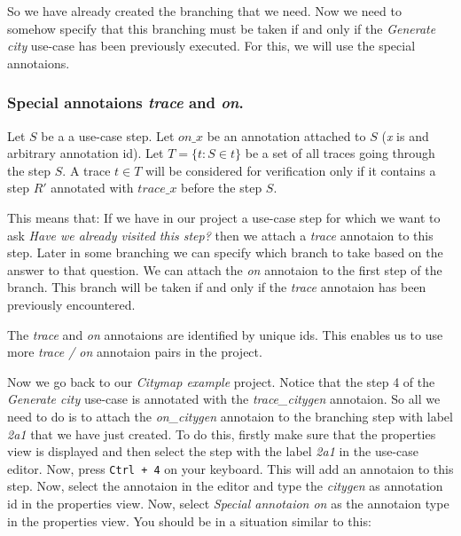 So we have already created the branching that we need. Now we need to somehow specify that this branching must be taken if and
only if the \emph{Generate city} use-case has been previously executed. For this, we will use the special annotaions.

\subsubsection{Special annotaions \emph{trace} and \emph{on}.}
\begin{definition}
	Let $S$ be a a use-case step.
	Let $on\_x$ be an annotation attached to $S$ (\emph{x} is and arbitrary annotation id).
	Let $T=\{t: S \in t\}$ be a set of all traces going through the step $S$.
	A trace $t \in T$ will be considered for verification only if it contains a step $R'$ annotated with $trace\_x$ before the step $S$.
\end{definition}

This means that: If we have in our project a use-case step for which we want to ask \emph{Have we already visited this step?} then
we attach a \emph{trace} annotaion to this step. Later in some branching we can specify which branch to take based on the answer
to that question. We can attach the \emph{on} annotaion to the first step of the branch. This branch will be taken if and only if
the \emph{trace} annotaion has been previously encountered.

The \emph{trace} and \emph{on} annotaions are identified by unique ids. This enables us to use more \emph{trace / on} annotaion
pairs in the project.

Now we go back to our \emph{Citymap example} project. Notice that the step 4 of the \emph{Generate city} use-case is annotated
with the \emph{trace\_citygen} annotaion. So all we need to do is to attach the \emph{on\_citygen} annotaion to the branching
step with label \emph{2a1} that we have just created. To do this, firstly make sure that the properties view is displayed and
then select the step with the label \emph{2a1} in the use-case editor. Now, press \texttt{Ctrl + 4} on your keyboard. This will
add an annotaion to this step. Now, select the annotaion in the editor and type the \emph{citygen} as annotation id in the
properties view. Now, select \emph{Special annotaion on} as the annotaion type in the properties view. You should be in a
situation similar to this:

